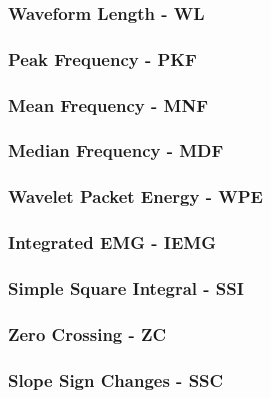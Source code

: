 \subsubsection{Waveform Length - WL} %
\label{sssec:waveform_length}

\subsubsection{Peak Frequency - PKF} %
\label{sssec:peak_frequency}

\subsubsection{Mean Frequency - MNF} %
\label{sssec:mean_frequency}



\subsubsection{Median Frequency - MDF} %
\label{sssec:median_frequency}



\subsubsection{Wavelet Packet Energy - WPE} %
\label{sssec:wavelet_packet_energy}

\subsubsection{Integrated EMG - IEMG} %
\label{sssec:integrated_emg}

\subsubsection{Simple Square Integral - SSI} %
\label{sssec:simple_square_integral}

\subsubsection{Zero Crossing - ZC} %
\label{sssec:zero_crossing}

\subsubsection{Slope Sign Changes - SSC} %
\label{sssec:slope_sign_changes}

